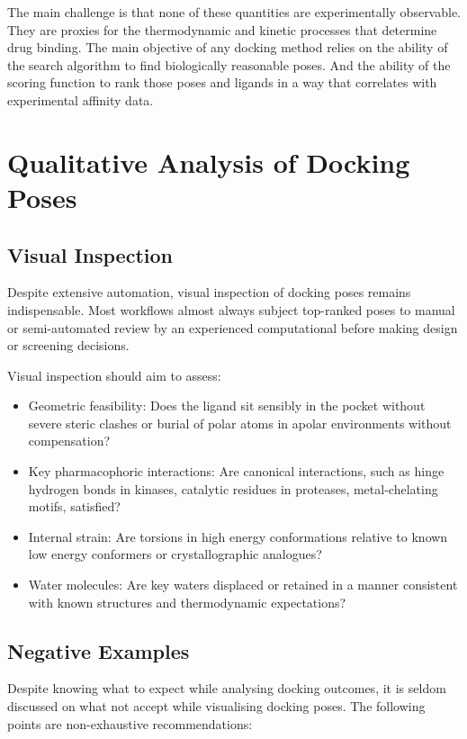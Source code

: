 \documentclass[12pt,a4paper]{article}
\begin{document}
The  main challenge is that none of these quantities are experimentally observable. They are proxies for the thermodynamic and kinetic processes that determine drug binding. The main objective of any docking method relies on the ability of the search algorithm to find biologically reasonable poses. And the ability of the scoring function to rank those poses and ligands in a way that correlates with experimental affinity data.\cite{CH8_wang2005,CH8_Cheng2009}

\section{Qualitative Analysis of Docking Poses}

\subsection{Visual Inspection}

Despite extensive automation, visual inspection of docking poses remains indispensable. Most workflows almost always subject top-ranked poses to manual or semi-automated review by an experienced computational before making design or screening decisions.\cite{CH8_Kitchen2004,CH8_Charting2015}

Visual inspection should aim to assess:

\begin{itemize}
  \item Geometric feasibility: Does the ligand sit sensibly in the pocket without severe steric clashes or burial of polar atoms in apolar environments without compensation?
  \item Key pharmacophoric interactions: Are canonical interactions, such as hinge hydrogen bonds in kinases, catalytic residues in proteases, metal-chelating motifs, satisfied?
  \item Internal strain: Are torsions in high energy conformations relative to known low energy conformers or crystallographic analogues?
  \item Water molecules: Are key waters displaced or retained in a manner consistent with known structures and thermodynamic expectations?
\end{itemize}

\subsection{Negative Examples}

Despite knowing what to expect while analysing docking outcomes, it is seldom discussed on what not accept while visualising docking poses. The following points are non-exhaustive recommendations:
\end{document}
